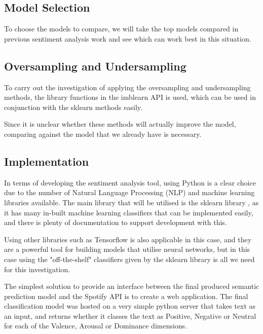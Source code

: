 \subsection{Model Selection}

To choose the models to compare, we will take the top models compared in previous sentiment analysis work \cite{towardsDS} and see which can work best in this situation. 

\subsection{Oversampling and Undersampling}

To carry out the investigation of applying the oversampling and undersampling methods, the library functions in the imblearn API is used, which can be used in conjunction with the sklearn methods easily. 

Since it is unclear whether these methods will actually improve the model, comparing against the model that we already have is necessary.


\subsection{Implementation}

In terms of developing the sentiment analysis tool, using Python is a clear choice due to the number of Natural Language Processing (NLP) and machine learning libraries available. The main library that will be utilised is the sklearn library \cite{sklearn}, as it has many in-built machine learning classifiers that can be implemented easily, and there is plenty of documentation to support development with this. 

Using other libraries such as Tensorflow is also applicable in this case,  and they are a powerful tool for building models that utilise neural networks, but in this case using the "off-the-shelf" classifiers given by the sklearn library is all we need for this investigation.

The simplest solution to provide an interface between the final produced semantic prediction model and the Spotify API is to create a web application.  The final classification model was hosted on a very simple python server that takes text as an input, and returns whether it classes the text as Positive, Negative or Neutral for each of the Valence, Arousal or Dominance dimensions. 

